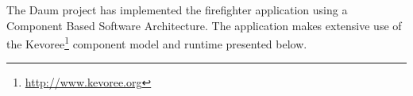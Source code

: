The Daum project has implemented the firefighter application using a Component Based Software Architecture.  The application makes extensive use of the Kevoree\footnote{\url{http://www.kevoree.org}\label{note:kevoree}} component model and runtime presented below.


